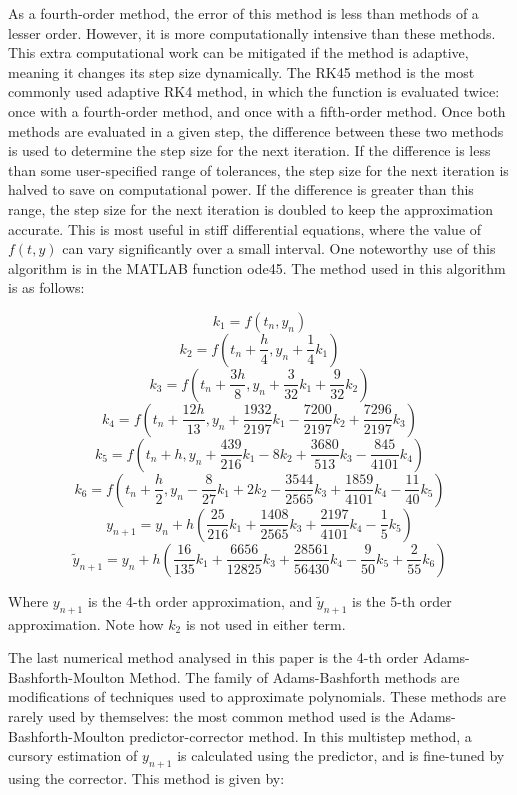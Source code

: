 \documentclass[11pt]{article}
\begin{document}
As a fourth-order method, the error of this method is less than methods of a lesser
order. However, it is more computationally intensive than these methods. This
extra computational work can be mitigated if the method is adaptive, meaning it
changes its step size dynamically. The RK45 method is the most commonly used
adaptive RK4 method, in which the function is evaluated twice: once with a
fourth-order method, and once with a fifth-order method. Once both methods are 
evaluated in a given step, the difference between these two methods is used to
determine the step size for the next iteration. If the difference is less than some
user-specified range of tolerances, the step size for the next iteration is halved
to save on computational power. If the difference is greater than this range, the
step size for the next iteration is doubled to keep the approximation accurate.
This is most useful in stiff differential equations, where the value of $f(t,y)$
can vary significantly over a small interval.
One noteworthy use of this algorithm is in the MATLAB function ode45. The method
used in this algorithm is as follows:

$$k_{1}=f(t_{n}, y_{n})$$
$$k_{2}=f\left(t_{n}+\frac{h}{4}, y_{n}+\frac{1}{4}k_{1}\right)$$
$$k_{3}=f\left(t_{n}+\frac{3h}{8}, y_{n}+\frac{3}{32}k_{1}+\frac{9}{32}k_{2}\right)$$
$$k_{4}=f\left(t_{n}+\frac{12h}{13}, y_{n}+\frac{1932}{2197}k_{1}-\frac{7200}{2197}k_{2}+\frac{7296}{2197}k_{3}\right)$$
$$k_{5}=f\left(t_{n}+h, y_{n}+\frac{439}{216}k_{1}-8k_{2}+\frac{3680}{513}k_{3}-\frac{845}{4101}k_{4}\right)$$
$$k_{6}=f\left(t_{n}+\frac{h}{2}, y_{n}-\frac{8}{27}k_{1}+2k_{2}-\frac{3544}{2565}k_{3}+\frac{1859}{4101}k_{4}-\frac{11}{40}k_{5}\right)$$
$$y_{n+1}=y_{n}+h\left(\frac{25}{216}k_{1}+\frac{1408}{2565}k_{3}+\frac{2197}{4101}k_{4}-\frac{1}{5}k_{5}\right)$$
$$\tilde y_{n+1}=y_{n}+h\left(\frac{16}{135}k_{1}+\frac{6656}{12825}k_{3}+\frac{28561}{56430}k_{4}-\frac{9}{50}k_{5}+\frac{2}{55}k_{6}\right)$$

Where $y_{n+1}$ is the 4-th order approximation, and $\tilde y_{n+1}$ is the 5-th
order approximation. Note how $k_{2}$ is not used in either term. 

The last numerical method analysed in this paper is the 4-th order
Adams-Bashforth-Moulton Method. The family of Adams-Bashforth methods are modifications
of techniques used to approximate polynomials. These methods are rarely used by
themselves: the most common method used is the Adams-Bashforth-Moulton
predictor-corrector method. In this multistep method, a cursory
estimation of $y_{n+1}$ is calculated using the predictor, and is fine-tuned by
using the corrector. This method is given by:
\end{document}
